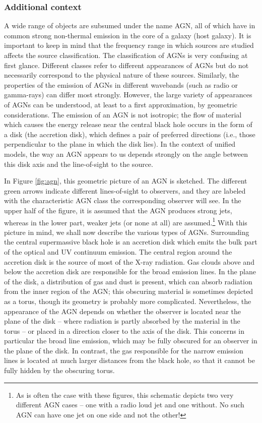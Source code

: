 \documentclass[a4paper,11pt]{article}
\begin{document}
\subsubsection{Additional context}

A wide range of objects are subsumed under the name AGN, all of which have in common strong non-thermal emission in the core of a galaxy (host galaxy). It is important to keep in mind that the frequency range in which sources are studied affects the source classification. The classification of AGNs is very confusing at first glance. Different classes refer to different appearances of AGNs but do not necessarily correspond to the physical nature of these sources. Similarly, the properties of the emission of AGNs in different wavebands (such as radio or gamma-rays) can differ most strongly. However, the large variety of appearances of AGNs can be understood, at least to a first approximation, by geometric considerations. The emission of an AGN is not isotropic; the flow of material which causes the energy release near the central black hole occurs in the form of a disk (the accretion disk), which defines a pair of preferred directions (i.e., those perpendicular to the plane in which the disk lies). In the context of unified models, the way an AGN appears to us depends strongly on the angle between this disk axis and the line-of-sight to the source.

{\noindent}In Figure \ref{fig:agn}, this geometric picture of an AGN is sketched. The different green arrows indicate different lines-of-sight to observers, and they are labeled with the characteristic AGN class the corresponding observer will see. In the upper half of the figure, it is assumed that the AGN produces strong jets, whereas in the lower part, weaker jets (or none at all) are assumed.\footnote{As is often the case with these figures, this schematic depicts two very different AGN cases -- one with a radio loud jet and one without. No such AGN can have one jet on one side and not the other!} With this picture in mind, we shall now describe the various types of AGNs. Surrounding the central supermassive black hole is an accretion disk which emits the bulk part of the optical and UV continuum emission. The central region around the accretion disk is the source of most of the X-ray radiation. Gas clouds above and below the accretion disk are responsible for the broad emission lines. In the plane of the disk, a distribution of gas and dust is present, which can absorb radiation from the inner region of the AGN; this obscuring material is sometimes depicted as a torus, though its geometry is probably more complicated. Nevertheless, the appearance of the AGN depends on whether the observer is located near the plane of the disk -- where radiation is partly absorbed by the material in the torus -- or placed in a direction closer to the axis of the disk. This concerns in particular the broad line emission, which may be fully obscured for an observer in the plane of the disk. In contrast, the gas responsible for the narrow emission lines is located at much larger distances from the black hole, so that it cannot be fully hidden by the obscuring torus. 
\end{document}
